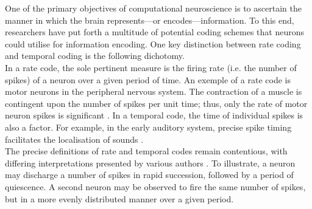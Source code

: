 

\noindent One of the primary objectives of computational neuroscience is to ascertain the manner in which the brain represents—or encodes—information. To this end, researchers have put forth a multitude of potential coding schemes that neurons could utilise for information encoding. One key distinction between rate coding and temporal coding is the following dichotomy. \\

\noindent In a rate code, the sole pertinent measure is the firing rate (i.e. the number of spikes) of a neuron over a given period of time. An exemple of a rate code is motor neurons in the peripheral nervous system. The contraction of a muscle is contingent upon the number of spikes per unit time; thus, only the rate of motor neuron spikes is significant \cite{gerstner1997neural}. In a temporal code, the time of individual spikes is also a factor. For example, in the early auditory system, precise spike timing facilitates the localisation of sounds \cite{chase2006spike}.\\

\noindent The precise definitions of rate and temporal codes remain contentious, with differing interpretations presented by various authors \cite{dayan2005theoretical}. To illustrate, a neuron may discharge a number of spikes in rapid succession, followed by a period of quiescence. A second neuron may be observed to fire the same number of spikes, but in a more evenly distributed manner over a given period. \\


